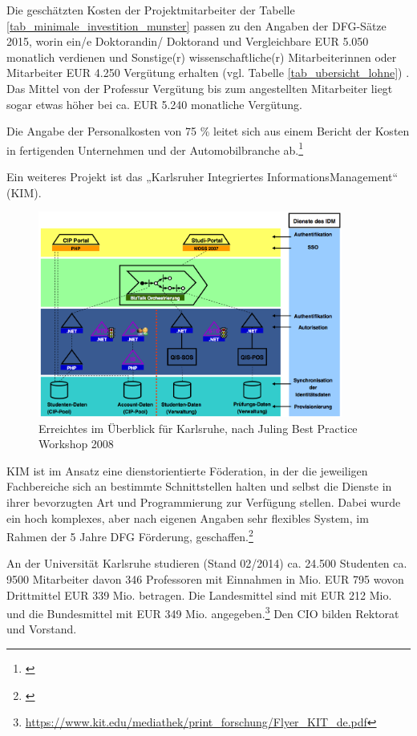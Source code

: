 Die geschätzten Kosten der Projektmitarbeiter der Tabelle \ref{tab_minimale_investition_munster} passen zu den Angaben der DFG-Sätze 2015, worin ein/e Doktorandin/ Doktorand und Vergleichbare EUR 5.050 monatlich verdienen und Sonstige(r) wissenschaftliche(r) Mitarbeiterinnen oder Mitarbeiter EUR 4.250 Vergütung erhalten (vgl. Tabelle \ref{tab_ubersicht_lohne}) . Das Mittel von der Professur Vergütung bis zum angestellten Mitarbeiter liegt sogar etwas höher bei ca. EUR 5.240 monatliche Vergütung.

Die Angabe der Personalkosten von 75 \%  leitet sich aus einem Bericht der Kosten in fertigenden Unternehmen und der Automobilbranche ab.\footnote{\cite{schuelein_2009}}

Ein weiteres Projekt ist das „Karlsruher Integriertes InformationsManagement“ (KIM).
\begin{figure}[h!]
	\centering
	\includegraphics[width=10cm]{kapitel/gruppe4_2/bilder/ubersicht_karlsruhe}
	\caption{Erreichtes im Überblick für Karlsruhe, nach Juling Best Practice Workshop 2008}
	\label{fig_ubersicht_karlsruhe}
\end{figure}

KIM ist im Ansatz eine dienstorientierte Föderation, in der die jeweiligen Fachbereiche sich an bestimmte Schnittstellen halten und selbst die Dienste in ihrer bevorzugten Art und Programmierung zur Verfügung stellen. Dabei wurde ein hoch komplexes, aber nach eigenen Angaben sehr flexibles System, im Rahmen der 5 Jahre DFG Förderung, geschaffen.\footnote{\cite{bode_informationsmanagement_2010}}

An der Universität Karlsruhe studieren (Stand 02/2014) ca. 24.500 Studenten ca. 9500 Mitarbeiter davon 346 Professoren mit Einnahmen in Mio. EUR 795 wovon Drittmittel EUR 339 Mio. betragen. Die Landesmittel sind mit EUR 212 Mio. und die Bundesmittel mit EUR 349 Mio. angegeben.\footnote{\url{https://www.kit.edu/mediathek/print_forschung/Flyer_KIT_de.pdf}} Den CIO bilden Rektorat und Vorstand.

